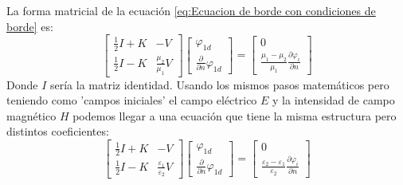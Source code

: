La forma matricial de la ecuación \eqref{eq:Ecuacion de borde con condiciones de borde} es:
\begin{equation}\label{eq:Forma matricial ecuacion 1}
\begin{bmatrix}
\frac{1}{2}I+K & -V \\ 
\frac{1}{2}I-K & \frac{\mu_2}{\mu_1}V
\end{bmatrix}
\begin{bmatrix}
\varphi_{1d}\\ 
\frac{\partial}{\partial n}\varphi_{1d}
\end{bmatrix}
=\begin{bmatrix}
0\\ 
\frac{\mu_1-\mu_2}{\mu_1}\frac{\partial \varphi_i}{\partial n}
\end{bmatrix}
\end{equation}
Donde $I$ sería la matriz identidad. Usando los mismos pasos matemáticos pero teniendo como 'campos iniciales' el campo eléctrico $E$ y la intensidad de campo magnético $H$ podemos llegar a una ecuación que tiene la misma estructura pero distintos coeficientes:
\begin{equation}
\begin{bmatrix}
\frac{1}{2}I+K & -V \\ 
\frac{1}{2}I-K & \frac{\varepsilon_1}{\varepsilon_2}V
\end{bmatrix}
\begin{bmatrix}
\varphi_{1d}\\ 
\frac{\partial}{\partial n}\varphi_{1d}
\end{bmatrix}
=\begin{bmatrix}
0\\ 
\frac{\varepsilon_2-\varepsilon_1}{\varepsilon_2}\frac{\partial \varphi_i}{\partial n}
\end{bmatrix}
\end{equation}
